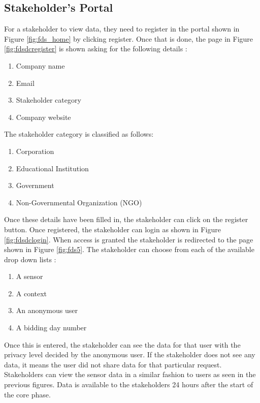 \subsection{Stakeholder's Portal}

For a stakeholder to view data, they need to register in the portal shown in Figure \ref{fig:fds_home} by clicking register. Once that is done,
the page in Figure \ref{fig:fdsdcregister} is shown asking for the following details :

\begin{enumerate}
    \item Company name
    \item Email
    \item Stakeholder category
    \item Company website
\end{enumerate}

The stakeholder category is classified as follows:

\begin{enumerate}
    \item Corporation
    \item Educational Institution
    \item Government
    \item Non-Governmental Organization (NGO)
\end{enumerate}

Once these details have been filled in, the stakeholder can click on the register button. Once registered, the stakeholder can login as shown in Figure \ref{fig:fdsdclogin}. When access is granted the stakeholder is redirected to the page shown in Figure \ref{fig:fds5}. The stakeholder can choose from each of the available drop down lists :

\begin{enumerate}
    \item A sensor
    \item A context
    \item An anonymous user
    \item A bidding day number
\end{enumerate}

Once this is entered, the stakeholder can see the  data for that user with the privacy level decided by the anonymous user. If the stakeholder does not see any data, it means the user did not share data for that particular request. Stakeholders can view the sensor data in a similar fashion to users as seen in the previous figures. Data is available to the stakeholders 24 hours after the start of the core phase.


